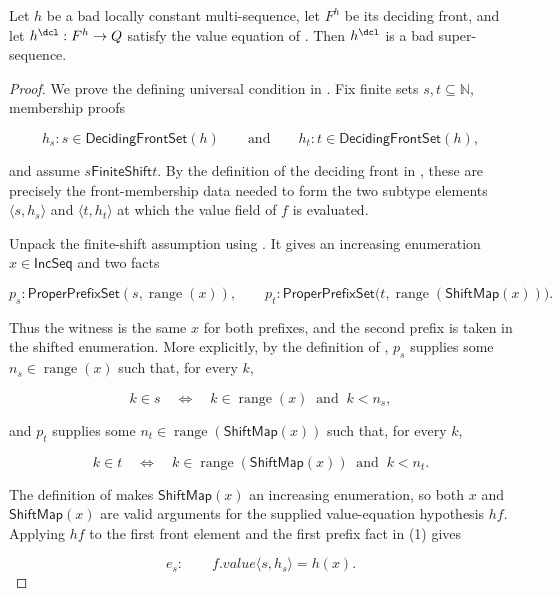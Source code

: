 \begin{lemma}
Let $h$ be a bad locally constant multi-sequence, let $F^h$ be its
deciding front, and let $h^{\dcl}:F^h\to Q$ satisfy the value equation of
.  Then $h^{\dcl}$ is a bad super-sequence.
\end{lemma}
\begin{proof}
We prove the defining universal condition in
.  Fix finite sets $s,t\subseteq\mathbb N$,
membership proofs

\[
 h_s:s\in\mathsf{DecidingFrontSet}(h)
 \qquad\text{and}\qquad
 h_t:t\in\mathsf{DecidingFrontSet}(h),
\]

and assume $s\mathrel{\mathsf{FiniteShift}}t$.  By the definition of the
deciding front in , these are precisely the
front-membership data needed to form the two subtype elements
$\langle s,h_s\rangle$ and $\langle t,h_t\rangle$ at which the value
field of $f$ is evaluated.

Unpack the finite-shift assumption using .  It gives
an increasing enumeration $x\in\mathsf{IncSeq}$ and two facts

\[
 p_s:\mathsf{ProperPrefixSet}(s,\operatorname{range}(x)),
 \qquad
 p_t:\mathsf{ProperPrefixSet}\bigl(t,
       \operatorname{range}(\mathsf{ShiftMap}(x))\bigr).
 \tag{1}
\]

Thus the witness is the same $x$ for both prefixes, and the second prefix
is taken in the shifted enumeration.  More explicitly, by the definition
of , $p_s$ supplies some $n_s\in
\operatorname{range}(x)$ such that, for every $k$,

\[
 k\in s\quad\Longleftrightarrow\quad
 k\in\operatorname{range}(x)\ \text{ and }\ k<n_s,
\]

and $p_t$ supplies some $n_t\in
\operatorname{range}(\mathsf{ShiftMap}(x))$ such that, for every $k$,

\[
 k\in t\quad\Longleftrightarrow\quad
 k\in\operatorname{range}(\mathsf{ShiftMap}(x))\ \text{ and }\ k<n_t.
\]

The definition of  makes $\mathsf{ShiftMap}(x)$ an
increasing enumeration, so both $x$ and $\mathsf{ShiftMap}(x)$ are valid
arguments for the supplied value-equation hypothesis $hf$.  Applying $hf$
to the first front element and the first prefix fact in (1) gives

\[
 e_s:\qquad
 f.value\langle s,h_s\rangle=h(x).
 \tag{2}
\]


\end{proof}
